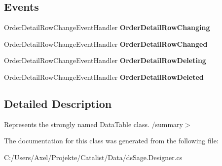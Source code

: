 \subsection*{Events}
\begin{DoxyCompactItemize}
\item 
Order\+Detail\+Row\+Change\+Event\+Handler {\bfseries Order\+Detail\+Row\+Changing}\hypertarget{class_products_1_1_data_1_1ds_sage_1_1_order_detail_data_table_ad21f7861f026d9a950f6c246635f0d0f}{}\label{class_products_1_1_data_1_1ds_sage_1_1_order_detail_data_table_ad21f7861f026d9a950f6c246635f0d0f}

\item 
Order\+Detail\+Row\+Change\+Event\+Handler {\bfseries Order\+Detail\+Row\+Changed}\hypertarget{class_products_1_1_data_1_1ds_sage_1_1_order_detail_data_table_a952e4df0b062824ad3e80139542a95f5}{}\label{class_products_1_1_data_1_1ds_sage_1_1_order_detail_data_table_a952e4df0b062824ad3e80139542a95f5}

\item 
Order\+Detail\+Row\+Change\+Event\+Handler {\bfseries Order\+Detail\+Row\+Deleting}\hypertarget{class_products_1_1_data_1_1ds_sage_1_1_order_detail_data_table_a8eed06b2a5c98fbd104460cc085d43b5}{}\label{class_products_1_1_data_1_1ds_sage_1_1_order_detail_data_table_a8eed06b2a5c98fbd104460cc085d43b5}

\item 
Order\+Detail\+Row\+Change\+Event\+Handler {\bfseries Order\+Detail\+Row\+Deleted}\hypertarget{class_products_1_1_data_1_1ds_sage_1_1_order_detail_data_table_a2abf58e42e834b82a05c3056787ab65e}{}\label{class_products_1_1_data_1_1ds_sage_1_1_order_detail_data_table_a2abf58e42e834b82a05c3056787ab65e}

\end{DoxyCompactItemize}


\subsection{Detailed Description}
Represents the strongly named Data\+Table class. /summary$>$ 

The documentation for this class was generated from the following file\+:\begin{DoxyCompactItemize}
\item 
C\+:/\+Users/\+Axel/\+Projekte/\+Catalist/\+Data/ds\+Sage.\+Designer.\+cs\end{DoxyCompactItemize}
